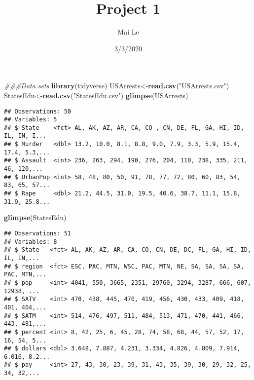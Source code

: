 \documentclass[
]{article}
\title{Project 1}
\author{Mai Le}
\date{3/3/2020}
\newenvironment{Shaded}{\begin{snugshade}}{\end{snugshade}}
\newcommand{\CommentTok}[1]{\textcolor[rgb]{0.56,0.35,0.01}{\textit{#1}}}
\newcommand{\KeywordTok}[1]{\textcolor[rgb]{0.13,0.29,0.53}{\textbf{#1}}}
\newcommand{\NormalTok}[1]{#1}
\newcommand{\StringTok}[1]{\textcolor[rgb]{0.31,0.60,0.02}{#1}}
\begin{document}
\maketitle

\begin{Shaded}
\begin{Highlighting}[]
\CommentTok{###Data sets}
\KeywordTok{library}\NormalTok{(tidyverse)}
\NormalTok{USArrests<-}\KeywordTok{read.csv}\NormalTok{(}\StringTok{"USArrests.csv"}\NormalTok{)}
\NormalTok{StatesEdu<-}\KeywordTok{read.csv}\NormalTok{(}\StringTok{"StatesEdu.csv"}\NormalTok{)}
\KeywordTok{glimpse}\NormalTok{(USArrests)}
\end{Highlighting}
\end{Shaded}

\begin{verbatim}
## Observations: 50
## Variables: 5
## $ State    <fct> AL, AK, AZ, AR, CA, CO , CN, DE, FL, GA, HI, ID, IL, IN, I...
## $ Murder   <dbl> 13.2, 10.0, 8.1, 8.8, 9.0, 7.9, 3.3, 5.9, 15.4, 17.4, 5.3,...
## $ Assault  <int> 236, 263, 294, 190, 276, 204, 110, 238, 335, 211, 46, 120,...
## $ UrbanPop <int> 58, 48, 80, 50, 91, 78, 77, 72, 80, 60, 83, 54, 83, 65, 57...
## $ Rape     <dbl> 21.2, 44.5, 31.0, 19.5, 40.6, 38.7, 11.1, 15.8, 31.9, 25.8...
\end{verbatim}

\begin{Shaded}
\begin{Highlighting}[]
\KeywordTok{glimpse}\NormalTok{(StatesEdu)}
\end{Highlighting}
\end{Shaded}

\begin{verbatim}
## Observations: 51
## Variables: 8
## $ State   <fct> AL, AK, AZ, AR, CA, CO, CN, DE, DC, FL, GA, HI, ID, IL, IN,...
## $ region  <fct> ESC, PAC, MTN, WSC, PAC, MTN, NE, SA, SA, SA, SA, PAC, MTN,...
## $ pop     <int> 4041, 550, 3665, 2351, 29760, 3294, 3287, 666, 607, 12938, ...
## $ SATV    <int> 470, 438, 445, 470, 419, 456, 430, 433, 409, 418, 401, 404,...
## $ SATM    <int> 514, 476, 497, 511, 484, 513, 471, 470, 441, 466, 443, 481,...
## $ percent <int> 8, 42, 25, 6, 45, 28, 74, 58, 68, 44, 57, 52, 17, 16, 54, 5...
## $ dollars <dbl> 3.648, 7.887, 4.231, 3.334, 4.826, 4.809, 7.914, 6.016, 8.2...
## $ pay     <int> 27, 43, 30, 23, 39, 31, 43, 35, 39, 30, 29, 32, 25, 34, 32,...
\end{verbatim}
\end{document}
